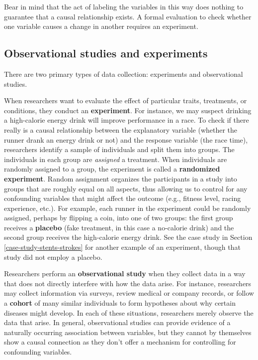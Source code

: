 \documentclass[
  10pt,
  openany]{book}
\begin{document}
Bear in mind that the act of labeling the variables in this way does nothing to guarantee that a causal relationship exists.
A formal evaluation to check whether one variable causes a change in another requires an experiment.

\hypertarget{observational-studies-and-experiments}{%
\subsection{Observational studies and experiments}\label{observational-studies-and-experiments}}

There are two primary types of data collection: experiments and observational studies.

When researchers want to evaluate the effect of particular traits, treatments, or conditions, they conduct an \textbf{experiment}.
For instance, we may suspect drinking a high-calorie energy drink will improve performance in a race.
To check if there really is a causal relationship between the explanatory variable (whether the runner drank an energy drink or not) and the response variable (the race time), researchers identify a sample of individuals and split them into groups.
The individuals in each group are \emph{assigned} a treatment.
When individuals are randomly assigned to a group, the experiment is called a \textbf{randomized experiment}.
Random assignment organizes the participants in a study into groups that are roughly equal on all aspects, thus allowing us to control for any confounding variables that might affect the outcome (e.g., fitness level, racing experience, etc.).
For example, each runner in the experiment could be randomly assigned, perhaps by flipping a coin, into one of two groups: the first group receives a \textbf{placebo} (fake treatment, in this case a no-calorie drink) and the second group receives the high-calorie energy drink.
See the case study in Section \ref{case-study-stents-strokes} for another example of an experiment, though that study did not employ a placebo.

Researchers perform an \textbf{observational study} when they collect data in a way that does not directly interfere with how the data arise.
For instance, researchers may collect information via surveys, review medical or company records, or follow a \textbf{cohort} of many similar individuals to form hypotheses about why certain diseases might develop.
In each of these situations, researchers merely observe the data that arise.
In general, observational studies can provide evidence of a naturally occurring association between variables, but they cannot by themselves show a causal connection as they don't offer a mechanism for controlling for confounding variables.
\end{document}
